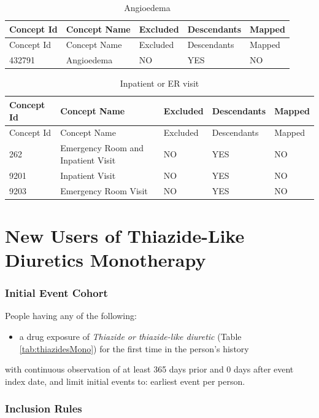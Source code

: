 \documentclass[10.5pt]{book}
\providecommand{\tightlist}{%
  \setlength{\itemsep}{0pt}\setlength{\parskip}{0pt}}
\theoremstyle{definition}
\theoremstyle{definition}
\theoremstyle{definition}
\theoremstyle{remark}
\begin{document}
\begin{longtable}[]{@{}lllll@{}}
\caption{\label{tab:angioedema} Angioedema}\tabularnewline
\toprule
Concept Id & Concept Name & Excluded & Descendants &
Mapped\tabularnewline
\midrule
\endfirsthead
\toprule
Concept Id & Concept Name & Excluded & Descendants &
Mapped\tabularnewline
\midrule
\endhead
432791 & Angioedema & NO & YES & NO\tabularnewline
\bottomrule
\end{longtable}

\begin{longtable}[]{@{}lllll@{}}
\caption{\label{tab:inpatientOrEr} Inpatient or ER visit}\tabularnewline
\toprule
Concept Id & Concept Name & Excluded & Descendants &
Mapped\tabularnewline
\midrule
\endfirsthead
\toprule
Concept Id & Concept Name & Excluded & Descendants &
Mapped\tabularnewline
\midrule
\endhead
262 & Emergency Room and Inpatient Visit & NO & YES & NO\tabularnewline
9201 & Inpatient Visit & NO & YES & NO\tabularnewline
9203 & Emergency Room Visit & NO & YES & NO\tabularnewline
\bottomrule
\end{longtable}

\section{New Users of Thiazide-Like Diuretics
Monotherapy}\label{ThiazidesMono}

\subsubsection*{Initial Event Cohort}\label{initial-event-cohort-4}

People having any of the following:

\begin{itemize}
\tightlist
\item
  a drug exposure of \emph{Thiazide or thiazide-like diuretic} (Table
  \ref{tab:thiazidesMono}) for the first time in the person's history
\end{itemize}

with continuous observation of at least 365 days prior and 0 days after
event index date, and limit initial events to: earliest event per
person.

\subsubsection*{Inclusion Rules}\label{inclusion-rules-1}
\end{document}
